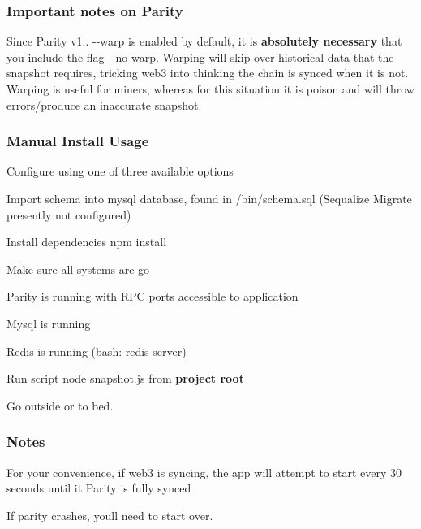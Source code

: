 \subsubsection*{Important notes on Parity}

Since Parity v1.. {\ttfamily -\/-\/warp} is enabled by default, it is {\bfseries absolutely necessary} that you include the flag {\ttfamily -\/-\/no-\/warp}. Warping will skip over historical data that the snapshot requires, tricking web3 into thinking the chain is synced when it is not. Warping is useful for miners, whereas for this situation it is poison and will throw errors/produce an inaccurate snapshot.

\subsubsection*{Manual Install Usage}


\begin{DoxyEnumerate}
\item Configure using one of three available options
\item Import schema into mysql database, found in {\ttfamily /bin/schema.sql} (Sequalize Migrate presently not configured)
\item Install dependencies {\ttfamily npm install}
\item Make sure all systems are go
\begin{DoxyEnumerate}
\item Parity is running with R\+PC ports accessible to application
\item Mysql is running
\item Redis is running ({\ttfamily bash\+: redis-\/server})
\end{DoxyEnumerate}
\end{DoxyEnumerate}
\begin{DoxyEnumerate}
\item Run script {\ttfamily node snapshot.\+js} from {\bfseries project root}
\item Go outside or to bed.
\end{DoxyEnumerate}

\subsubsection*{Notes}


\begin{DoxyItemize}
\item For your convenience, if web3 is syncing, the app will attempt to start every 30 seconds until it Parity is fully synced
\item If parity crashes, you\textquotesingle{}ll need to start over.
\end{DoxyItemize}

